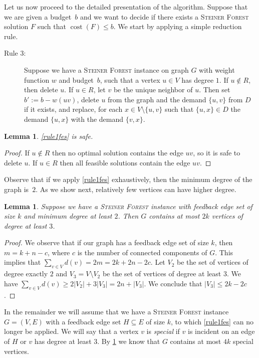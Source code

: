 \documentclass[a4paper]{article}
\makeatletter
\theoremstyle{plain}
\newtheorem{lemma}[theorem]{Lemma}%
\newcommand{\pname}[1]{\textsc{#1}}
\newcommand{\customlabel}[2]{%
   \protected@write \@auxout {}{\string \newlabel {#1}{{#2}{\thepage}{#2}{#1}{}} }%
   \hypertarget{#1}{}
}
\DeclareMathOperator{\cost}{cost}
\newcommand{\SF}{\pname{Steiner Forest}\xspace}
\makeatother
\begin{document}
Let us now proceed to the detailed presentation of the algorithm. Suppose that
we are given 
%
%
a budget~$b$ and we want to decide if there exists a \SF solution $F$ such
that $\cost(F)\le b$.
%
We start by applying a simple reduction rule.

\begin{description} 
\item[Rule 3:]\customlabel{rule1fes}{Rule 3} Suppose we have a \SF instance on
graph $G$ with weight function $w$ and budget~$b$, such that a vertex $u\in V$
has degree $1$.  If $u\not\in R$, then delete $u$.  If $u\in R$, let $v$ be the
unique neighbor of $u$. Then  set $b':=b-w(uv)$, delete $u$ from the graph and
the demand $\{u,v\}$ from $D$ if it exists, and replace, for each $x\in
V\setminus\{u,v\}$ such that $\{u,x\}\in D$ the demand $\{u,x\}$ with the
demand $\{v,x\}$.
\end{description}

\begin{lemma}\label{lem:leaf} %
\ref{rule1fes} is safe. 
\end{lemma}

%
\begin{proof}%
If $u\not\in R$ then no optimal solution contains the edge $uv$,
so it is safe to delete $u$. If $u\in R$ then all feasible solutions contain
the edge $uv$. \end{proof}
%

Observe that if we apply \ref{rule1fes} exhaustively, then the minimum degree of the graph is~$2$. As we show next,
relatively few vertices can have higher degree.

\begin{lemma}\label{lem:deg3} %
Suppose we have a \SF instance with feedback edge
set of size $k$ and minimum degree at least $2$.  Then $G$ contains at most
$2k$ vertices of degree at least $3$. 
\end{lemma}

%
\begin{proof}%
We observe that if our graph has a feedback edge set of size
$k$, then $m= k+n-c$, where $c$ is the number of connected components of $G$.
This implies that $\sum_{v\in V}d(v) = 2m = 2k+2n-2c$. Let $V_2$ be the set of
vertices of degree exactly $2$ and $V_3=V\setminus V_2$ be the set of vertices
of degree at least $3$. We have $\sum_{v\in V}d(v) \ge 2|V_2|+3|V_3| = 2n
+|V_3|$. We conclude that $|V_3|\le 2k-2c$.  \end{proof}
%


In the remainder we will assume that we have a \SF instance $G=(V,E)$ with a
feedback edge set $H\subseteq E$ of size $k$, to which \ref{rule1fes} can no longer be
applied. We will say that a vertex $v$ is \emph{special} if $v$ is incident on
an edge of $H$ or $v$ has degree at least $3$. By \cref{lem:deg3} we know that
$G$ contains at most $4k$ special vertices.
\end{document}
